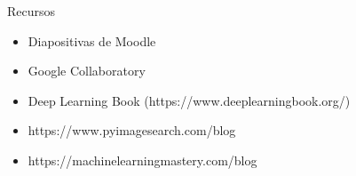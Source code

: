 \begin{frame}{Recursos}
\begin{itemize}
    \item Diapositivas de Moodle
    \item Google Collaboratory
    \item Deep Learning Book (https://www.deeplearningbook.org/)
    \item https://www.pyimagesearch.com/blog
    \item https://machinelearningmastery.com/blog
\end{itemize}
\end{frame}


